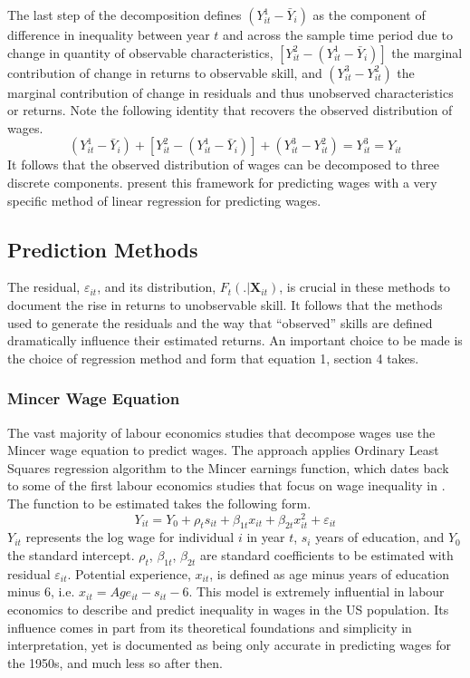 \documentclass[notitlepage,12pt]{article}
\begin{document}
The last step of the decomposition defines $(Y_{it}^1-\bar{Y}_i)$ as the component of difference in inequality between year $t$ and across the sample time period due to change in quantity of observable characteristics, $[Y_{it}^2 - (Y_{it}^1-\bar{Y}_i)]$ the marginal contribution of change in returns to observable skill, and $(Y_{it}^3 - Y_{it}^2)$ the marginal contribution of change in residuals and thus unobserved characteristics or returns.  Note the following identity that recovers the observed distribution of wages.
\begin{equation}
(Y_{it}^1-\bar{Y}_i) + [Y_{it}^2 - (Y_{it}^1-\bar{Y}_i)] + (Y_{it}^3 - Y_{it}^2) = Y_{it}^3 = Y_{it}
\end{equation}
It follows that the observed distribution of wages can be decomposed to three discrete components.  \cite{juhn1993wage} present this framework for predicting wages with a very specific method of linear regression for predicting wages.

\subsection{Prediction Methods}
The residual, $\varepsilon_{it}$, and its distribution, $F_t(.| \mathbf{X}_{it})$, is crucial in these methods to document the rise in returns to unobservable skill.  It follows that the methods used to generate the residuals and the way that ``observed'' skills are defined dramatically influence their estimated returns.
An important choice to be made is the choice of regression method and form that equation 1, section 4 takes.

\subsubsection{Mincer Wage Equation}
The vast majority of labour economics studies that decompose wages use the Mincer wage equation to predict wages.  The approach applies Ordinary Least Squares regression algorithm to the Mincer earnings function, which dates back to some of the first labour economics studies that focus on wage inequality in \cite{mincer1958investment, mincer1974schooling}.  The function to be estimated takes the following form.
\begin{equation}
Y_{it}  = Y_0 + \rho_t s_{it} +\beta_{1t} x_{it} + \beta_{2t} x_{it}^2 + \varepsilon_{it}
\end{equation}
$Y_{it}$ represents the log wage for individual $i$ in year $t$, $s_i$ years of education, and $Y_0$ the standard intercept.  $\rho_t$, $\beta_{1t}$, $\beta_{2t}$ are standard coefficients to be estimated with residual $\varepsilon_{it}$.  Potential experience, $x_{it}$, is defined as age minus years of education minus 6, i.e. $x_{it} = Age_{it} - s_{it} - 6$.  This model is extremely influential in labour economics to describe and predict inequality in wages in the US population.  Its influence comes in part from its theoretical foundations and simplicity in interpretation, yet is documented as being only accurate in predicting wages for the 1950s, and much less so after then. 
\end{document}
